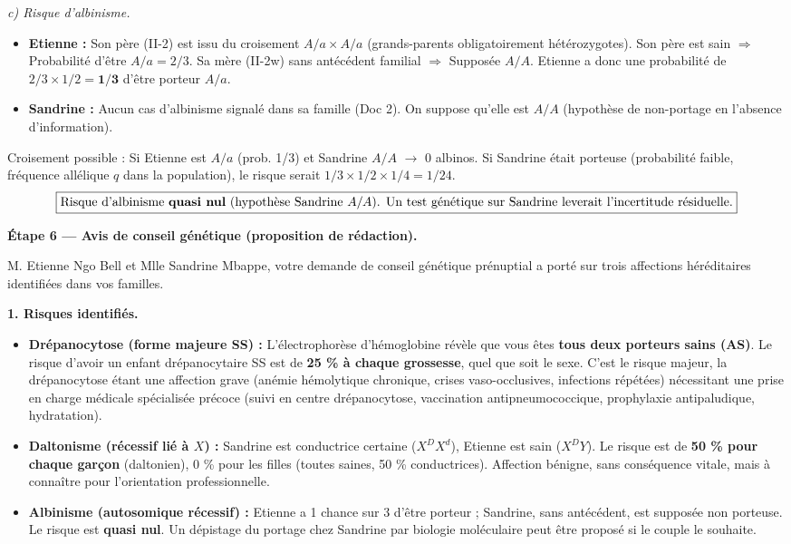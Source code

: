 \documentclass[11pt]{article}
\begin{document}
\begin{exoresolu}
\emph{c) Risque d'albinisme.}
\begin{itemize}
\item \textbf{Etienne :} Son père (II-2) est issu du croisement $A/a \times A/a$ (grands-parents obligatoirement hétérozygotes). Son père est sain $\Rightarrow$ Probabilité d'être $A/a = 2/3$. Sa mère (II-2w) sans antécédent familial $\Rightarrow$ Supposée $A/A$. Etienne a donc une probabilité de $2/3 \times 1/2 = \mathbf{1/3}$ d'être porteur $A/a$.
\item \textbf{Sandrine :} Aucun cas d'albinisme signalé dans sa famille (Doc 2). On suppose qu'elle est \textbf{$A/A$} (hypothèse de non-portage en l'absence d'information).
\end{itemize}
Croisement possible : Si Etienne est $A/a$ (prob. 1/3) et Sandrine $A/A$ $\rightarrow$ $0$ albinos.
Si Sandrine était porteuse (probabilité faible, fréquence allélique $q$ dans la population), le risque serait $1/3 \times 1/2 \times 1/4 = 1/24$.
\[
\boxed{\text{Risque d'albinisme \textbf{quasi nul} (hypothèse Sandrine $A/A$). Un test génétique sur Sandrine leverait l'incertitude résiduelle.}}
\]

\textbf{Étape 6 — Avis de conseil génétique (proposition de rédaction).}

\begin{aretenir}
M. Etienne Ngo Bell et Mlle Sandrine Mbappe, votre demande de conseil génétique prénuptial a porté sur trois affections héréditaires identifiées dans vos familles.

\textbf{1. Risques identifiés.}
\begin{itemize}
\item \textbf{Drépanocytose (forme majeure SS) :} L'électrophorèse d'hémoglobine révèle que vous êtes \textbf{tous deux porteurs sains (AS)}. Le risque d'avoir un enfant drépanocytaire SS est de \textbf{25 \% à chaque grossesse}, quel que soit le sexe. C'est le risque majeur, la drépanocytose étant une affection grave (anémie hémolytique chronique, crises vaso-occlusives, infections répétées) nécessitant une prise en charge médicale spécialisée précoce (suivi en centre drépanocytose, vaccination antipneumococcique, prophylaxie antipaludique, hydratation).
\item \textbf{Daltonisme (récessif lié à $X$) :} Sandrine est conductrice certaine ($X^D X^d$), Etienne est sain ($X^D Y$). Le risque est de \textbf{50 \% pour chaque garçon} (daltonien), 0 \% pour les filles (toutes saines, 50 \% conductrices). Affection bénigne, sans conséquence vitale, mais à connaître pour l'orientation professionnelle.
\item \textbf{Albinisme (autosomique récessif) :} Etienne a 1 chance sur 3 d'être porteur ; Sandrine, sans antécédent, est supposée non porteuse. Le risque est \textbf{quasi nul}. Un dépistage du portage chez Sandrine par biologie moléculaire peut être proposé si le couple le souhaite.
\end{itemize}


\end{aretenir}
\end{exoresolu}
\end{document}
